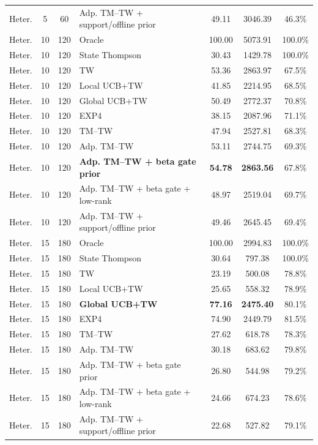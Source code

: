 \begin{table}[t]
{\begin{tabular}{lcclccc}
Heter. & 5 & 60 & Adp. TM--TW + support/offline prior & 49.11 & 3046.39 & 46.3\% \\
\addlinespace
Heter. & 10 & 120 & Oracle & 100.00 & 5073.91 & 100.0\% \\
Heter. & 10 & 120 & State Thompson & 30.43 & 1429.78 & 100.0\% \\
Heter. & 10 & 120 & TW & 53.36 & 2863.97 & 67.5\% \\
Heter. & 10 & 120 & Local UCB+TW & 41.85 & 2214.95 & 68.5\% \\
Heter. & 10 & 120 & Global UCB+TW & 50.49 & 2772.37 & 70.8\% \\
Heter. & 10 & 120 & EXP4 & 38.15 & 2087.96 & 71.1\% \\
Heter. & 10 & 120 & TM--TW & 47.94 & 2527.81 & 68.3\% \\
Heter. & 10 & 120 & Adp. TM--TW & 53.11 & 2744.75 & 69.3\% \\
Heter. & 10 & 120 & \textbf{Adp. TM--TW + beta gate prior} & \textbf{54.78} & \textbf{2863.56} & 67.8\% \\
Heter. & 10 & 120 & Adp. TM--TW + beta gate + low-rank & 48.97 & 2519.04 & 69.7\% \\
Heter. & 10 & 120 & Adp. TM--TW + support/offline prior & 49.46 & 2645.45 & 69.4\% \\
\addlinespace
Heter. & 15 & 180 & Oracle & 100.00 & 2994.83 & 100.0\% \\
Heter. & 15 & 180 & State Thompson & 30.64 & 797.38 & 100.0\% \\
Heter. & 15 & 180 & TW & 23.19 & 500.08 & 78.8\% \\
Heter. & 15 & 180 & Local UCB+TW & 25.65 & 558.32 & 78.9\% \\
Heter. & 15 & 180 & \textbf{Global UCB+TW} & \textbf{77.16} & \textbf{2475.40} & 80.1\% \\
Heter. & 15 & 180 & EXP4 & 74.90 & 2449.79 & 81.5\% \\
Heter. & 15 & 180 & TM--TW & 27.62 & 618.78 & 78.3\% \\
Heter. & 15 & 180 & Adp. TM--TW & 30.18 & 683.62 & 79.8\% \\
Heter. & 15 & 180 & Adp. TM--TW + beta gate prior & 26.80 & 544.98 & 79.2\% \\
Heter. & 15 & 180 & Adp. TM--TW + beta gate + low-rank & 24.66 & 674.23 & 78.6\% \\
Heter. & 15 & 180 & Adp. TM--TW + support/offline prior & 22.68 & 527.82 & 79.1\% \\
\bottomrule
\end{tabular}%
}
\end{table}
